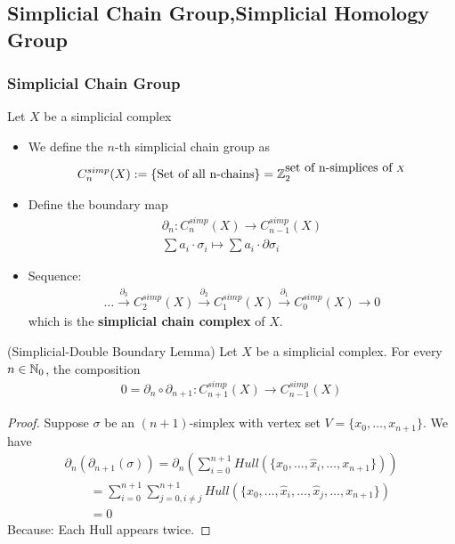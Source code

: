 \documentclass[Total.tex]{subfiles}
\begin{document}
			\subsection{Simplicial Chain Group,Simplicial Homology Group}
			\subsubsection{Simplicial Chain Group}
			\begin{Def}
				Let $X$ be a simplicial complex
				\begin{itemize}
					\item We define the $n$-th simplicial chain group as
					\begin{gather*}
						C_n^{simp}(X):=\{\mbox{Set of all n-chains}\}=\mathbb{Z}_2^{\mbox{set of n-simplices of }X}
					\end{gather*}
					\item Define the boundary map
					\begin{gather*}
						\partial_n:C_n^{simp}(X)\rightarrow C_{n-1}^{simp}(X)\\
						\sum a_i\cdot \sigma_i\mapsto \sum a_i\cdot \partial \sigma_i
					\end{gather*}
					\item Sequence:
					\begin{gather*}
						\dots\stackrel{\partial_3}{\rightarrow} C_2^{simp}(X)\stackrel{\partial_2}{\rightarrow} C_1^{simp}(X)\stackrel{\partial_1}{\rightarrow} C_0^{simp}(X)\rightarrow 0
					\end{gather*}
					which is the \textbf{simplicial chain complex} of $X$.
				\end{itemize}
			\end{Def}
			\begin{lemma}
				(Simplicial-Double Boundary Lemma) Let $X$ be a simplicial complex. For every $n\in \mathbb{N}_0$, the composition
				\begin{gather*}
					0=\partial_n\circ \partial_{n+1}:C_{n+1}^{simp}(X)\rightarrow C_{n-1}^{simp}(X)
				\end{gather*}
			\end{lemma}
			\begin{proof}
				Suppose $\sigma$ be an $(n+1)$-simplex with vertex set $V=\{x_0,\dots,x_{n+1}\}$. We have
				\begin{gather*}
					\partial_n(\partial_{n+1}(\sigma))=\partial_n(\sum_{i=0}^{n+1} Hull(\{x_0,\dots,\hat{x}_i,\dots,x_{n+1}\}))\\
					\qquad=\sum_{i=0}^{n+1}\sum_{j=0,i\not=j}^{n+1} Hull(\{x_0,\dots,\hat{x}_i,\dots,\hat{x}_j,\dots,x_{n+1}\})\\
					\qquad=0
				\end{gather*}
				Because: Each Hull appears twice.
			\end{proof}
			
\end{document}
